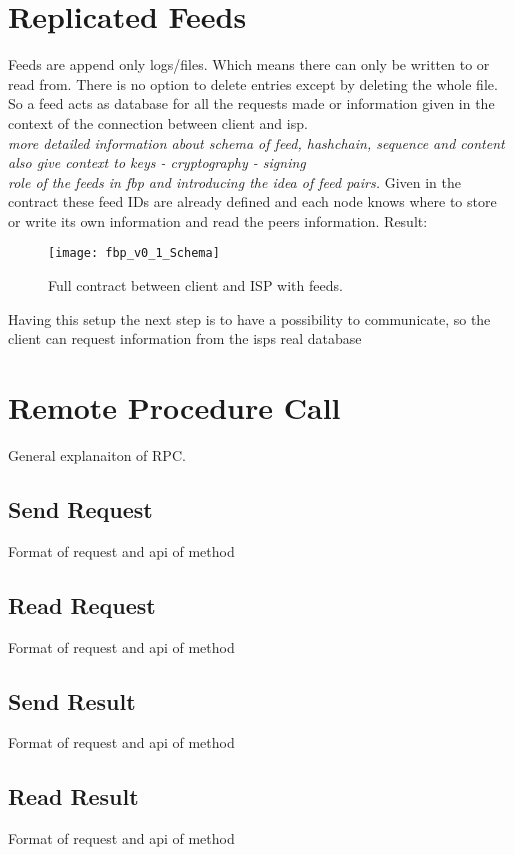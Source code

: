 \section{Replicated Feeds}
Feeds are append only logs/files. Which means there can only be written to or read from. There is no option to delete entries except by deleting the whole file. So a feed acts as database for all the requests made or information given in the context of the connection between client and isp.\\
\textit{more detailed information about schema of feed, hashchain, sequence and content}\\
\textit{also give context to keys - cryptography - signing}\\
\textit{role of the feeds in fbp and introducing the idea of feed pairs.}
Given in the contract these feed IDs are already defined and each node knows where to store or write its own information and read the peers information.
Result:

\begin{figure}
    \centering
    \texttt{[image: fbp\_v0\_1\_Schema]}
    \caption{Full contract between client and ISP with feeds.}
    \label{fig:contract_cli_isp}
\end{figure}

Having this setup the next step is to have a possibility to communicate, so the client can request information from the isps real database

\pagebreak
\section{Remote Procedure Call}
General explanaiton of RPC.

\subsection{Send Request}
Format of request and api of method
\subsection{Read Request}
Format of request and api of method
\subsection{Send Result}
Format of request and api of method
\subsection{Read Result}
Format of request and api of method

